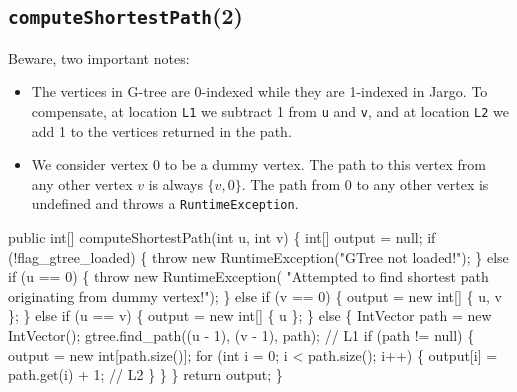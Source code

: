 \documentclass{article}
\def\nwendcode{\endtrivlist \endgroup}      %
\let\nwdocspar=\par
\begin{document}
\subsection{{\tt{}\protect{}computeShortestPath}(2)}
Beware, two important notes:
\begin{itemize}
\item The vertices in G-tree are 0-indexed while they are 1-indexed in Jargo.  To
compensate, at location {\tt{}L1} we subtract 1 from {\tt{}u} and {\tt{}v}, and at
location {\tt{}L2} we add 1 to the vertices returned in the path.
\item We consider vertex 0 to be a dummy vertex. The path to this vertex
from any other vertex $v$ is always $\{v, 0\}$. The path from 0 to any other
vertex is undefined and throws a {\tt{}RuntimeException}.
\end{itemize}
\nwenddocs{}\endmoddef{}
public int[] computeShortestPath(int u, int v) \{
  int[] output = null;
  if (!flag_gtree_loaded) \{
    throw new RuntimeException("GTree not loaded!");
  \} else if (u == 0) \{
    throw new RuntimeException(
        "Attempted to find shortest path originating from dummy vertex!");
  \} else if (v == 0) \{
    output = new int[] \{ u, v \};
  \} else if (u == v) \{
    output = new int[] \{ u \};
  \} else \{
    IntVector path = new IntVector();
    gtree.find_path((u - 1), (v - 1), path);        // L1
    if (path != null) \{
      output = new int[path.size()];
      for (int i = 0; i < path.size(); i++) \{
        output[i] = path.get(i) + 1;                // L2
      \}
    \}
  \}
  return output;
\}
\eatline
{}\nwendcode{}\nwdocspar
\end{document}
